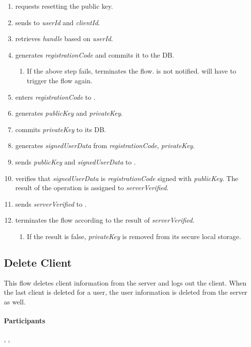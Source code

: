 \documentclass[a4paper,10pt,draft]{article}
\newcommand{\signedUserData}{\emph{signedUserData}}
\newcommand{\serverVerified}{\emph{serverVerified}}
\newcommand{\handle}{\emph{handle}}
\newcommand{\registrationCode}{\emph{registrationCode}}
\newcommand{\privateKey}{\emph{privateKey}}
\newcommand{\publicKey}{\emph{publicKey}}
\newcommand{\userId}{\emph{userId}}
\newcommand{\clientId}{\emph{clientId}}
\begin{document}
\begin{enumerate}
 \item \User{} requests resetting the public key.
 \item \Client{} sends to \Server{} \userId{} and \clientId{}.
 \item \Server{} retrieves \handle{} based on \userId.
 \item \Server{} generates \registrationCode{} and commits it to the DB.
 \begin{enumerate}
  \item If the above step fails, \Server{} terminates the flow. \Client{} is 
not notified. \User{} will have to trigger the flow again.
 \end{enumerate}
 \item \User{} enters \registrationCode{} to \Client{}.
 \item \Client{} generates \publicKey{} and \privateKey{}.
 \item \Client{} commits \privateKey{} to its DB.
 \item \Client{} generates \signedUserData{} from \registrationCode{}, 
\privateKey{}.
 \item \Client{} sends \publicKey{} and \signedUserData{} to \Server{}.
 \item \Server{} verifies that \signedUserData{} is \registrationCode{} signed 
with \publicKey{}. The result of the operation is assigned to \serverVerified{}.
 \item \Server{} sends \serverVerified{} to \Client{}.
 \item \Client{} terminates the flow according to the result of 
\serverVerified{}.
 \begin{enumerate}
  \item If the result is false, \privateKey{} is removed from its secure local 
storage.
 \end{enumerate}
\end{enumerate}

\subsection{Delete Client}
This flow deletes client information from the server and logs out the client. 
When the last client is deleted for a user, the user information is deleted 
from the server as well.

\paragraph{Participants} \Client{}, \Server{}, \User{}
\end{document}
